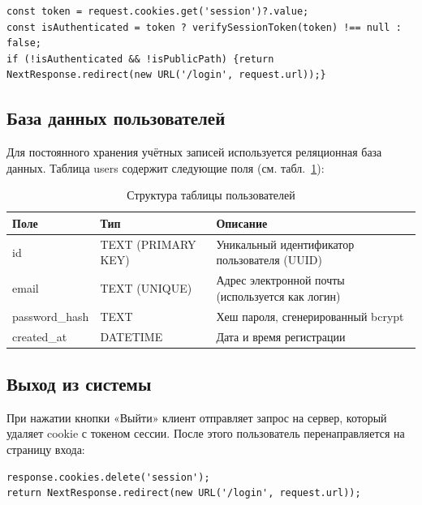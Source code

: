 \begin{code}
\label{code:checkMiddleware}
\vspace{-0.75cm}\begin{verbatim}
const token = request.cookies.get('session')?.value;
const isAuthenticated = token ? verifySessionToken(token) !== null : false;
if (!isAuthenticated && !isPublicPath) {return NextResponse.redirect(new URL('/login', request.url));}
\end{verbatim}
\end{code}

\subsection{База данных пользователей}
Для постоянного хранения учётных записей используется реляционная база данных. Таблица users содержит следующие поля (см. табл.~\ref{tab:users}):

\begin{table}[H]
\begin{center}
\caption{Структура таблицы пользователей}
\label{tab:users}
\begin{tabular}{|p{3cm}|p{4cm}|p{8cm}|}
\hline
\textbf{Поле} & \textbf{Тип} & \textbf{Описание} \\ \hline
id & TEXT (PRIMARY KEY) & Уникальный идентификатор пользователя (UUID) \\ \hline
email & TEXT (UNIQUE) & Адрес электронной почты (используется как логин) \\ \hline
password\_hash & TEXT & Хеш пароля, сгенерированный bcrypt \\ \hline
created\_at & DATETIME & Дата и время регистрации \\ \hline
\end{tabular}
\end{center}
\end{table}

\subsection{Выход из системы}
При нажатии кнопки «Выйти» клиент отправляет запрос на сервер, который удаляет cookie с токеном сессии. После этого пользователь перенаправляется на страницу входа:

\begin{code}
\label{code:Exit}
\vspace{-0.75cm}\begin{verbatim}
response.cookies.delete('session');
return NextResponse.redirect(new URL('/login', request.url));
\end{verbatim}
\end{code}

